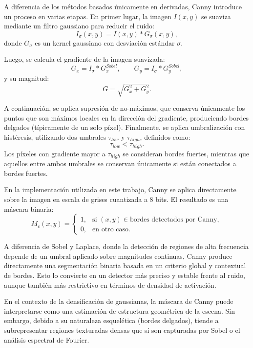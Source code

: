 A diferencia de los métodos basados únicamente en derivadas, Canny introduce un proceso en varias etapas. En primer lugar, la imagen $I(x,y)$ se suaviza mediante un filtro gaussiano para reducir el ruido:
\begin{equation}
I_\sigma(x,y) = I(x,y) * G_\sigma(x,y),
\end{equation}
donde $G_\sigma$ es un kernel gaussiano con desviación estándar $\sigma$.

Luego, se calcula el gradiente de la imagen suavizada:
\begin{equation}
G_x = I_\sigma * G_x^{Sobel}, \qquad G_y = I_\sigma * G_y^{Sobel},
\end{equation}
y su magnitud:
\begin{equation}
G = \sqrt{G_x^2 + G_y^2}.
\end{equation}

A continuación, se aplica supresión de no-máximos, que conserva únicamente los puntos que son máximos locales en la dirección del gradiente, produciendo bordes delgados (típicamente de un solo píxel). Finalmente, se aplica umbralización con histéresis, utilizando dos umbrales $\tau_{low}$ y $\tau_{high}$, definidos como:
\begin{equation}
\tau_{low} < \tau_{high}.
\end{equation}
Los píxeles con gradiente mayor a $\tau_{high}$ se consideran bordes fuertes, mientras que aquellos entre ambos umbrales se conservan únicamente si están conectados a bordes fuertes.

En la implementación utilizada en este trabajo, Canny se aplica directamente sobre la imagen en escala de grises cuantizada a 8 bits. El resultado es una máscara binaria:
\begin{equation}
M_c(x,y) =
\begin{cases}
1, & \text{si } (x,y) \in \text{bordes detectados por Canny}, \\
0, & \text{en otro caso}.
\end{cases}
\end{equation}

A diferencia de Sobel y Laplace, donde la detección de regiones de alta frecuencia depende de un umbral aplicado sobre magnitudes continuas, Canny produce directamente una segmentación binaria basada en un criterio global y contextual de bordes. Esto lo convierte en un detector más preciso y estable frente al ruido, aunque también más restrictivo en términos de densidad de activación.

En el contexto de la densificación de gaussianas, la máscara de Canny puede interpretarse como una estimación de estructura geométrica de la escena. Sin embargo, debido a su naturaleza esquelética (bordes delgados), tiende a subrepresentar regiones texturadas densas que sí son capturadas por Sobel o el análisis espectral de Fourier.

